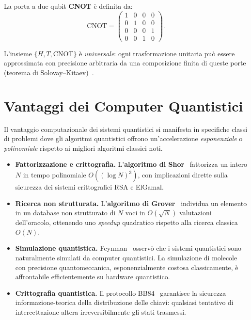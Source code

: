 La porta a due qubit \textbf{CNOT} è definita da:
\begin{equation}
  \mathrm{CNOT} = \begin{pmatrix}1&0&0&0\\0&1&0&0\\0&0&0&1\\0&0&1&0\end{pmatrix}.
\end{equation}

L'insieme $\{H, T, \mathrm{CNOT}\}$ è \textit{universale}: ogni trasformazione
unitaria può essere approssimata con precisione arbitraria da una composizione
finita di queste porte (teorema di Solovay--Kitaev)~\cite{nielsen2010quantum}.

\section{Vantaggi dei Computer Quantistici}
\label{sec:vantaggi}

Il vantaggio computazionale dei sistemi quantistici si manifesta in specifiche
classi di problemi dove gli algoritmi quantistici offrono un'accelerazione
\textit{esponenziale} o \textit{polinomiale} rispetto ai migliori algoritmi
classici noti.

\begin{itemize}
  \item \textbf{Fattorizzazione e crittografia.}
    L'\textbf{algoritmo di Shor}~\cite{shor1994algorithms} fattorizza un intero
    $N$ in tempo polinomiale $O((\log N)^3)$, con implicazioni dirette sulla
    sicurezza dei sistemi crittografici RSA e ElGamal.

  \item \textbf{Ricerca non strutturata.}
    L'\textbf{algoritmo di Grover}~\cite{grover1996fast} individua un elemento in
    un database non strutturato di $N$ voci in $O(\sqrt{N})$ valutazioni
    dell'oracolo, ottenendo uno \textit{speedup} quadratico rispetto alla ricerca
    classica $O(N)$.

  \item \textbf{Simulazione quantistica.}
    Feynman~\cite{feynman1982simulating} osservò che i sistemi quantistici sono
    naturalmente simulati da computer quantistici. La simulazione di molecole con
    precisione quantomeccanica, esponenzialmente costosa classicamente, è
    affrontabile efficientemente su hardware quantistico.

  \item \textbf{Crittografia quantistica.}
    Il protocollo BB84~\cite{bennett1984bb84} garantisce la sicurezza
    informazione-teorica della distribuzione delle chiavi: qualsiasi tentativo
    di intercettazione altera irreversibilmente gli stati trasmessi.
\end{itemize}

